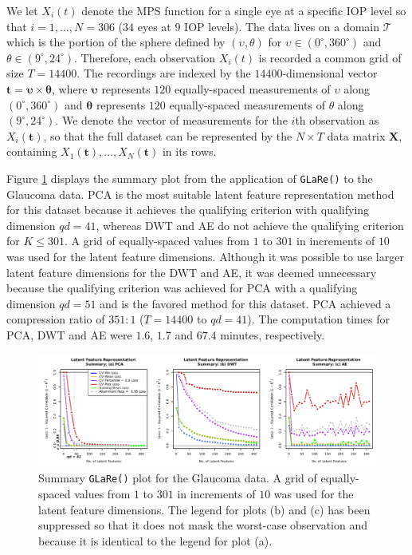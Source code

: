 We let $X_i(t)$ denote the MPS function for a single eye at a specific IOP level so that $i = 1, \dots, N = 306$ ($34$ eyes at $9$ IOP levels).
The data lives on a domain $\mathcal{T}$ which is the portion of the sphere defined by $(\upsilon, \theta)$ for $\upsilon \in (0^{\circ}, 360^{\circ})$ and $\theta \in (9^{\circ}, 24^{\circ})$.
Therefore, each observation $X_i(t)$ is recorded a common grid of size $T = 14400$.
The recordings are indexed by the $14400$-dimensional vector $\mathbf{t} = \boldsymbol{\upsilon} \times \boldsymbol{\theta}$, where $\boldsymbol{\upsilon}$ represents $120$ equally-spaced measurements of $\upsilon$ along $(0^{\circ}, 360^{\circ})$ and $\boldsymbol{\theta}$ represents $120$ equally-spaced measurements of $\theta$ along $(9^{\circ}, 24^{\circ})$.
We denote the vector of measurements for the $i$th observation as $X_i(\mathbf{t})$, so that the full dataset can be represented by the $N \times T$ data matrix $\mathbf{X}$, containing $X_1(\mathbf{t}), \dots, X_N(\mathbf{t})$ in its rows.

Figure \ref{fig:eye-results} displays the summary plot from the application of \texttt{GLaRe()} to the Glaucoma data.
PCA is the most suitable latent feature representation method for this dataset because it achieves the qualifying criterion with qualifying dimension $qd=41$, whereas DWT and AE do not achieve the qualifying criterion for $K \leq 301$.
A grid of equally-spaced values from $1$ to $301$ in increments of $10$ was used for the latent feature dimensions.
Although it was possible to use larger latent feature dimensions for the DWT and AE, it was deemed unnecessary because the qualifying criterion was achieved for PCA with a qualifying dimension $qd=51$ and is the favored method for this dataset.
PCA achieved a compression ratio of $351:1$ ($T = 14400$ to $qd = 41$).
The computation times for PCA, DWT and AE were $1.6$, $1.7$ and $67.4$ minutes, respectively.


\begin{figure}
    \centering
    \includegraphics[width=1\linewidth]{figures/eye-results.pdf}
    \caption{Summary \texttt{GLaRe()} plot for the Glaucoma data. A grid of equally-spaced values from $1$ to $301$ in increments of $10$ was used for the latent feature dimensions. 
    The legend for plots (b) and (c) has been suppressed so that it does not mask the worst-case observation and because it is identical to the legend for plot (a).}
    \label{fig:eye-results}
\end{figure}

